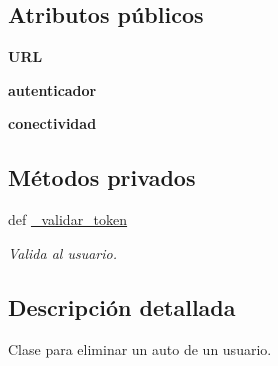 \subsection*{Atributos públicos}
\begin{DoxyCompactItemize}
\item 
\hypertarget{classsrc_1_1resources_1_1eliminar_auto_usuario_1_1_eliminar_auto_usuario_ad60fbd3793bd874bc6dd83884b2bab2f}{{\bfseries U\-R\-L}}\label{classsrc_1_1resources_1_1eliminar_auto_usuario_1_1_eliminar_auto_usuario_ad60fbd3793bd874bc6dd83884b2bab2f}

\item 
\hypertarget{classsrc_1_1resources_1_1eliminar_auto_usuario_1_1_eliminar_auto_usuario_ab77bd6a65a9a217084342983fed700d3}{{\bfseries autenticador}}\label{classsrc_1_1resources_1_1eliminar_auto_usuario_1_1_eliminar_auto_usuario_ab77bd6a65a9a217084342983fed700d3}

\item 
\hypertarget{classsrc_1_1resources_1_1eliminar_auto_usuario_1_1_eliminar_auto_usuario_a4fd3505d3c37588826fa87a7ce64672d}{{\bfseries conectividad}}\label{classsrc_1_1resources_1_1eliminar_auto_usuario_1_1_eliminar_auto_usuario_a4fd3505d3c37588826fa87a7ce64672d}

\end{DoxyCompactItemize}
\subsection*{Métodos privados}
\begin{DoxyCompactItemize}
\item 
def \hyperlink{classsrc_1_1resources_1_1eliminar_auto_usuario_1_1_eliminar_auto_usuario_aab03bbccdc074042c069401e1f2c6a84}{\-\_\-validar\-\_\-token}
\begin{DoxyCompactList}\small\item\em Valida al usuario. \end{DoxyCompactList}\end{DoxyCompactItemize}


\subsection{Descripción detallada}
Clase para eliminar un auto de un usuario. 



